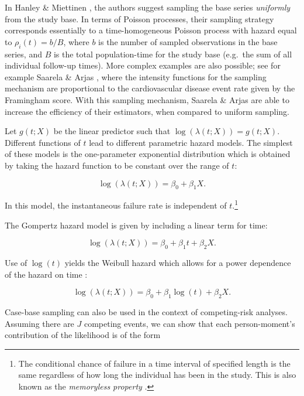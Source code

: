 \documentclass[
]{jss}
\begin{document}
In Hanley \& Miettinen \citeyearpar{hanley2009fitting}, the authors
suggest sampling the base series \emph{uniformly} from the study base.
In terms of Poisson processes, their sampling strategy corresponds
essentially to a time-homogeneous Poisson process with hazard equal to
\(\rho_i(t) = b/B\), where \(b\) is the number of sampled observations
in the base series, and \(B\) is the total population-time for the study
base (e.g.~the sum of all individual follow-up times). More complex
examples are also possible; see for example Saarela \& Arjas
\citeyearpar{saarela2015non}, where the intensity functions for the
sampling mechanism are proportional to the cardiovascular disease event
rate given by the Framingham score. With this sampling mechanism,
Saarela \& Arjas are able to increase the efficiency of their
estimators, when compared to uniform sampling.

Let \(g(t; X)\) be the linear predictor such that
\(\log(\lambda(t;X)) = g(t; X)\). Different functions of \(t\) lead to
different parametric hazard models. The simplest of these models is the
one-parameter exponential distribution which is obtained by taking the
hazard function to be constant over the range of \(t\):

\begin{equation}
\log(\lambda(t; X)) = \beta_0 + \beta_1 X. \label{eq:exp}
\end{equation}

In this model, the instantaneous failure rate is independent of
\(t\).\footnote{The conditional chance of failure in a time interval of specified length is the same regardless of how long the individual has been in the study. This is also known as the \textit{memoryless property} \citep{kalbfleisch2011statistical}.}

The Gompertz hazard model is given by including a linear term for time:

\begin{equation}
\log(\lambda(t; X)) = \beta_0 + \beta_1 t + \beta_2 X. \label{eq:gomp}
\end{equation}

Use of \(\log(t)\) yields the Weibull hazard which allows for a power
dependence of the hazard on time \citep{kalbfleisch2011statistical}:

\begin{equation}
\log(\lambda(t; X)) = \beta_0 + \beta_1 \log(t) + \beta_2 X. \label{eq:weibull}
\end{equation}

Case-base sampling can also be used in the context of competing-risk
analyses. Assuming there are \(J\) competing events, we can show that
each person-moment's contribution of the likelihood is of the form
\end{document}
